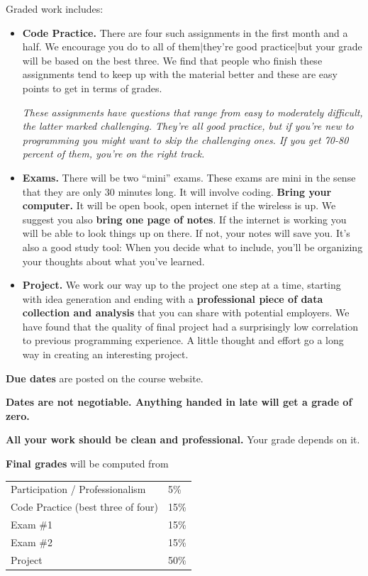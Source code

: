 Graded work includes:
\begin{itemize}

\item {\bf Code Practice.\/}
There are four such assignments in the first month and a half. We encourage you do to all of them|they're good practice|but your grade will be based on the best three. We find that people who finish these assignments tend to keep up with the material better and these are easy points to get in terms of grades.

{\it These assignments have questions that range from easy to moderately difficult,
the latter marked {\it challenging\/}.
They're all good practice, but if you're new to programming you
might want to skip the challenging ones.
If you get 70-80 percent of them, you're on the right track. \/}

\item {\bf Exams.\/}
There will be two ``mini'' exams. These exams are mini in the sense that they are only 30 minutes long. It will involve coding. {\bf Bring your computer.\/} It will be open book, open internet if the wireless is up. We suggest you also {\bf bring one page of notes\/}.
If the internet is working you will be able to look things up on there.
If not, your notes will save you.
It's also a good study tool:  When you decide what to include,
you'll be organizing your thoughts about what you've learned.


\item {\bf Project.\/}
We work our way up to the project one step at a time, starting with idea generation and ending
with a {\bf professional piece of data collection and analysis\/}
that you can share with potential employers. We have found that the quality
of final project had a surprisingly low correlation to previous programming experience. A little thought and
effort go a long way in creating an interesting project.

\end{itemize}


{\bf Due dates} are posted on the course website.

{\bf Dates are not negotiable.
Anything handed in late will get a grade of zero.\/}

{\bf All your work should be clean and professional.}  Your grade depends on it.

{\bf Final grades\/} will be computed from
\begin{center}
\begin{tabular}{ll}
Participation / Professionalism & 5\% \\
Code Practice (best three of four) & 15\% \\
Exam \#1        & 15\% \\
Exam \#2        & 15\% \\
Project     & 50\% \\
\end{tabular}
\end{center}

